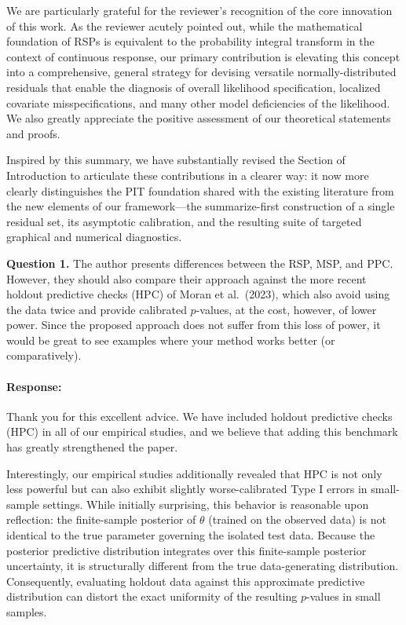 \documentclass[11pt]{article}
\newcommand*{\mybox}[2]{%
  \par\medskip\noindent
  \colorbox{#1!30}{\parbox{.98\linewidth}{#2}}%
  \par\medskip
}
\begin{document}
We are particularly grateful for the reviewer's recognition of the core innovation of this work. As the reviewer acutely pointed out, while the mathematical foundation of RSPs is equivalent to the probability integral transform in the context of continuous response, our primary contribution is elevating this concept into a comprehensive, general strategy for devising versatile normally-distributed residuals that enable the diagnosis of  overall likelihood specification, localized covariate misspecifications, and many other model deficiencies of the likelihood. We also greatly appreciate the positive assessment of our theoretical statements and proofs.

Inspired by this summary, we have substantially revised the Section of Introduction to articulate these contributions in a clearer way: it now more clearly distinguishes the PIT foundation shared with the existing literature from the new elements of our framework---the summarize-first construction of a single residual set, its asymptotic calibration, and the resulting suite of targeted graphical and numerical diagnostics. 


\medskip

\mybox{gray}{\textbf{Question 1.} The author presents differences between the RSP, MSP, and PPC. However, they should also compare their approach against the more recent holdout predictive checks (HPC) of Moran et al.\ (2023), which also avoid using the data twice and provide calibrated $p$-values, at the cost, however, of lower power. Since the proposed approach does not suffer from this loss of power, it would be great to see examples where your method works better (or comparatively).}

\paragraph{Response:}
Thank you for this excellent advice. We have included holdout predictive checks (HPC) in all of our empirical studies, and we believe that adding this benchmark has greatly strengthened the paper. 

Interestingly, our empirical studies additionally revealed that HPC is not only less powerful but can also exhibit slightly worse-calibrated Type I errors in small-sample settings. While initially surprising, this behavior is reasonable upon reflection: the finite-sample posterior of $\theta$ (trained on the observed data) is not identical to the true parameter governing the isolated test data. Because the posterior predictive distribution integrates over this finite-sample posterior uncertainty, it is structurally different from the true data-generating distribution. Consequently, evaluating holdout data against this approximate predictive distribution can distort the exact uniformity of the resulting $p$-values in small samples. 
\end{document}
